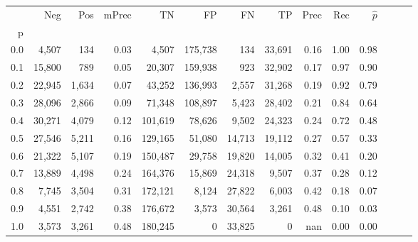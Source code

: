 \begin{tabular}{rrrrrrrrrrrrrr}
\toprule
{} &     Neg &    Pos & mPrec &       TN &       FP &      FN &      TP &  Prec &   Rec & $\hat{p}$ \\
p   &         &        &       &          &          &         &         &       &       &           \\
\midrule
0.0 &   4,507 &    134 &  0.03 &    4,507 &  175,738 &     134 &  33,691 &  0.16 &  1.00 &      0.98 \\
0.1 &  15,800 &    789 &  0.05 &   20,307 &  159,938 &     923 &  32,902 &  0.17 &  0.97 &      0.90 \\
0.2 &  22,945 &  1,634 &  0.07 &   43,252 &  136,993 &   2,557 &  31,268 &  0.19 &  0.92 &      0.79 \\
0.3 &  28,096 &  2,866 &  0.09 &   71,348 &  108,897 &   5,423 &  28,402 &  0.21 &  0.84 &      0.64 \\
0.4 &  30,271 &  4,079 &  0.12 &  101,619 &   78,626 &   9,502 &  24,323 &  0.24 &  0.72 &      0.48 \\
0.5 &  27,546 &  5,211 &  0.16 &  129,165 &   51,080 &  14,713 &  19,112 &  0.27 &  0.57 &      0.33 \\
0.6 &  21,322 &  5,107 &  0.19 &  150,487 &   29,758 &  19,820 &  14,005 &  0.32 &  0.41 &      0.20 \\
0.7 &  13,889 &  4,498 &  0.24 &  164,376 &   15,869 &  24,318 &   9,507 &  0.37 &  0.28 &      0.12 \\
0.8 &   7,745 &  3,504 &  0.31 &  172,121 &    8,124 &  27,822 &   6,003 &  0.42 &  0.18 &      0.07 \\
0.9 &   4,551 &  2,742 &  0.38 &  176,672 &    3,573 &  30,564 &   3,261 &  0.48 &  0.10 &      0.03 \\
1.0 &   3,573 &  3,261 &  0.48 &  180,245 &        0 &  33,825 &       0 &   nan &  0.00 &      0.00 \\
\bottomrule
\end{tabular}
